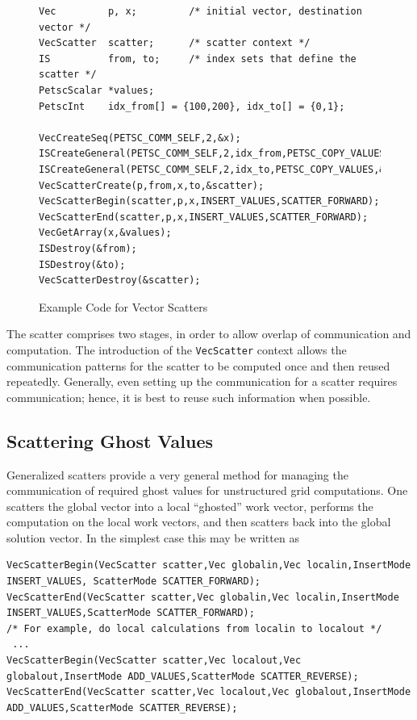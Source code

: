 \begin{figure}[tb]
\begin{lstlisting}
Vec         p, x;         /* initial vector, destination vector */
VecScatter  scatter;      /* scatter context */
IS          from, to;     /* index sets that define the scatter */
PetscScalar *values;
PetscInt    idx_from[] = {100,200}, idx_to[] = {0,1};

VecCreateSeq(PETSC_COMM_SELF,2,&x);
ISCreateGeneral(PETSC_COMM_SELF,2,idx_from,PETSC_COPY_VALUES,&from);
ISCreateGeneral(PETSC_COMM_SELF,2,idx_to,PETSC_COPY_VALUES,&to);
VecScatterCreate(p,from,x,to,&scatter);
VecScatterBegin(scatter,p,x,INSERT_VALUES,SCATTER_FORWARD);
VecScatterEnd(scatter,p,x,INSERT_VALUES,SCATTER_FORWARD);
VecGetArray(x,&values);
ISDestroy(&from);
ISDestroy(&to); 
VecScatterDestroy(&scatter);
\end{lstlisting}
\caption{Example Code for Vector Scatters}
\label{fig_vecscatter}
\end{figure}

The scatter comprises two stages, in order to allow overlap of
communication and computation. The introduction of the
\lstinline{VecScatter} context allows the communication patterns for the scatter
to be computed once and then reused repeatedly. Generally, even
setting up the communication for a scatter requires communication;
hence, it is best to reuse such information when possible.

\subsection{Scattering Ghost Values}

Generalized scatters provide a very general method for managing the communication of
required ghost values for unstructured grid computations. One scatters
the global vector into a local ``ghosted'' work vector, performs the computation
on the local work vectors, and then scatters back into the global solution
vector. In the simplest case this may be written as
\begin{lstlisting}
VecScatterBegin(VecScatter scatter,Vec globalin,Vec localin,InsertMode INSERT_VALUES, ScatterMode SCATTER_FORWARD);
VecScatterEnd(VecScatter scatter,Vec globalin,Vec localin,InsertMode INSERT_VALUES,ScatterMode SCATTER_FORWARD);
/* For example, do local calculations from localin to localout */
 ...
VecScatterBegin(VecScatter scatter,Vec localout,Vec globalout,InsertMode ADD_VALUES,ScatterMode SCATTER_REVERSE);
VecScatterEnd(VecScatter scatter,Vec localout,Vec globalout,InsertMode ADD_VALUES,ScatterMode SCATTER_REVERSE);
\end{lstlisting}

